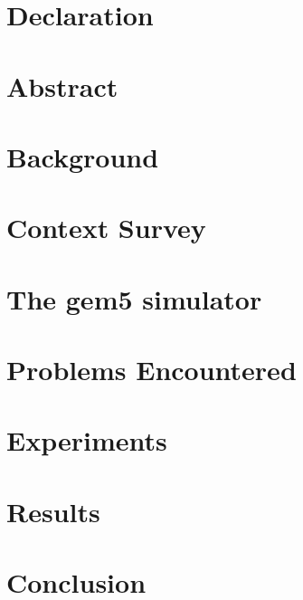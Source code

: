 \documentclass[12pt]{report}
\begin{document}
    
    
    
    \chapter*{Declaration}
    
    
    \chapter*{Abstract}
    
    
    \tableofcontents
    
    \chapter{Background}
    
    
    \chapter{Context Survey}
    
    
    \chapter{The gem5 simulator}
    
    
    \chapter{Problems Encountered}
    
    
    \chapter{Experiments}\label{ch:experiments}
    
    
    \chapter{Results}
    
    
    \chapter{Conclusion}
    
    
\end{document}
